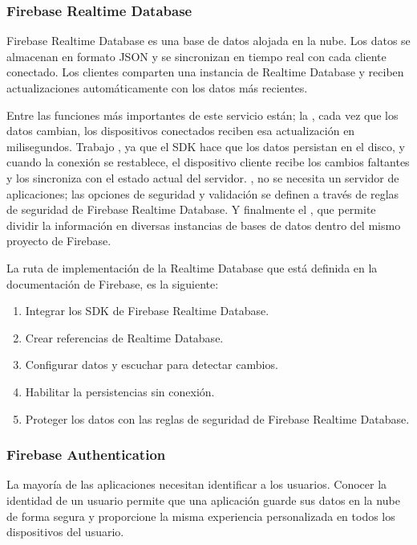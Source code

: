 \subsubsection{Firebase Realtime Database}
\label{\detokenize{chapter_one/firebase:firebase-realtime-database}}
Firebase Realtime Database es una base de datos alojada en la nube.
Los datos se almacenan en formato JSON y se sincronizan en tiempo real con cada
cliente conectado. Los clientes comparten una instancia de Realtime Database y
reciben actualizaciones automáticamente con los datos más recientes.

Entre las funciones más importantes de este servicio están; la
, cada vez que los datos cambian,
los dispositivos conectados reciben esa actualización en milisegundos.
Trabajo , ya que el SDK hace que los datos persistan en el disco,
y cuando la conexión se restablece, el dispositivo cliente recibe los cambios
faltantes y los sincroniza con el estado actual del servidor.
, no se necesita un servidor de
aplicaciones; las opciones de seguridad y validación se definen a través de
reglas de seguridad de Firebase Realtime Database. Y finalmente
el , que permite dividir la información
en diversas instancias de bases de datos dentro del mismo proyecto de Firebase.

La ruta de implementación de la Realtime Database que está definida en la documentación de Firebase,
es la siguiente:
\begin{enumerate}
\item {} 
Integrar los SDK de Firebase Realtime Database.

\item {} 
Crear referencias de Realtime Database.

\item {} 
Configurar datos y escuchar para detectar cambios.

\item {} 
Habilitar la persistencias sin conexión.

\item {} 
Proteger los datos con las reglas de seguridad de Firebase Realtime Database.

\end{enumerate}


\subsubsection{Firebase Authentication}
\label{\detokenize{chapter_one/firebase:firebase-authentication}}
La mayoría de las aplicaciones necesitan identificar a los usuarios. Conocer la
identidad de un usuario permite que una aplicación guarde sus datos en la nube de
forma segura y proporcione la misma experiencia personalizada en todos los
dispositivos del usuario.


